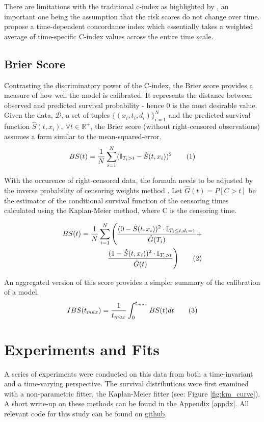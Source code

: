 \documentclass[%
 twocolumn,
 reprint,
 amsmath,amssymb,
 aps,nofootinbib
]{revtex4-2}
\newcommand\numberthis{\addtocounter{equation}{1}\tag{\theequation}} %
\begin{document}
There are limitations with the traditional c-index as highlighted by \cite{Hartman_Kim_He_Kalbfleisch_2023}, an important one being the assumption that the risk scores do not change over time. \cite{Heagerty_Zheng_2005} propose a time-dependent concordance index which essentially takes a weighted average of time-specific C-index values across the entire time scale.

\subsection{\label{ibs}Brier Score}

Contrasting the discriminatory power of the C-index, the Brier score provides a measure of how well the model is calibrated. It represents the distance between observed and predicted survival probability - hence 0 is the most desirable value. Given the data, $\mathcal{D}$, a set of tuples $\{(x_i , t_i , d_i)\}_{i=1}^{N}$ and the predicted survival function $\hat{S}(t, x_i),\ \forall t \in \mathbb{R^{+}}$, the Brier score (without right-censored observations) assumes a form similar to the mean-squared-error.
\[
BS(t) = \frac{1}{N}\sum^{N}_{i=1}(\mathbb{I}_{T_i>t}-\hat{S}(t, x_i))^2 \numberthis  \label{eq:bs}
\]

With the occurence of right-censored data, the formula needs to be adjusted by the inverse probability of censoring weights method \cite{graf_bs}. Let $\hat{G}(t) = P[C>t]$ be the estimator of the conditional survival function of the censoring times calculated using the Kaplan-Meier method, where C is the censoring time.

\begin{align*}
BS(t) = \frac{1}{N}\sum^{N}_{i=1}\Bigg(\frac{(0-\hat{S}(t,x_i))^2 \cdot \mathbb{I}_{T_i\le t, d_i = 1}}{\hat{G}(T_i)} +\\
\frac{(1-\hat{S}(t,x_i))^2 \cdot \mathbb{I}_{T_i > t}}{\hat{G}(t)} \Bigg) \numberthis  \label{eq:bs_ipcw}
\end{align*}

An aggregated version of this score provides a simpler summary of the calibration of a model.
\[
IBS(t_{max})= \frac{1}{t_{max}} \int^{t_{max}}_{0} BS(t) dt \numberthis  \label{eq:ibs}
\]

\section{\label{exp}Experiments and Fits}
A series of experiments  were conducted on this data from both a time-invariant and a time-varying perspective. The  survival distributions were first examined with a non-parametric fitter, the Kaplan-Meier fitter (see: Figure \ref{fig:km_curve}). A short write-up on these methods can be found in the Appendix \ref{appdx}. All relevant code for this study can be found on \href{https://github.com/sourasen1011/UoE_Research_Project_2023/tree/dev}{github}.\\
\end{document}
